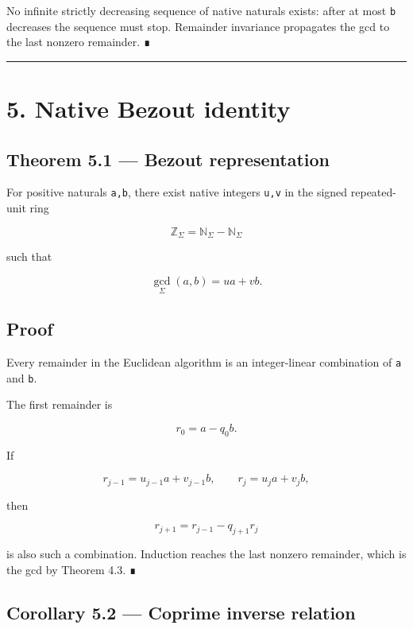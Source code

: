 No infinite strictly decreasing sequence of native naturals exists: after at
most \texttt{b} decreases the sequence must stop. Remainder invariance propagates the
gcd to the last nonzero remainder. ∎

\begin{center}\rule{0.5\linewidth}{0.5pt}\end{center}

\hypertarget{native-bezout-identity}{%
\section{5. Native Bezout identity}\label{native-bezout-identity}}

\hypertarget{theorem-5.1-bezout-representation}{%
\subsection{Theorem 5.1 --- Bezout representation}\label{theorem-5.1-bezout-representation}}

For positive naturals \texttt{a,b}, there exist native integers \texttt{u,v} in the signed
repeated-unit ring

\[
\mathbb Z_\Sigma
=
\mathbb N_\Sigma-\mathbb N_\Sigma
\]

such that

\[
\boxed{
\gcd_\Sigma(a,b)=ua+vb.
}
\]

\hypertarget{proof-4}{%
\subsection{Proof}\label{proof-4}}

Every remainder in the Euclidean algorithm is an integer-linear combination of
\texttt{a} and \texttt{b}.

The first remainder is

\[
r_0=a-q_0b.
\]

If

\[
r_{j-1}=u_{j-1}a+v_{j-1}b,
\qquad
r_j=u_ja+v_jb,
\]

then

\[
r_{j+1}=r_{j-1}-q_{j+1}r_j
\]

is also such a combination. Induction reaches the last nonzero remainder, which
is the gcd by Theorem 4.3. ∎

\hypertarget{corollary-5.2-coprime-inverse-relation}{%
\subsection{Corollary 5.2 --- Coprime inverse relation}\label{corollary-5.2-coprime-inverse-relation}}

